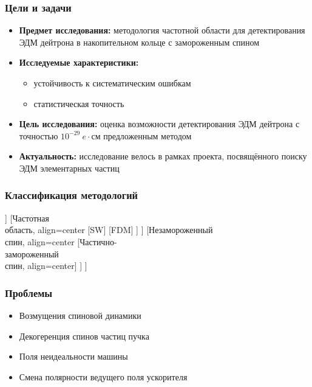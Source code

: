 \documentclass[14pt]{beamer}
\begin{document}
\begin{frame}
\frametitle{Цели и задачи}
\begin{itemize}
  \item \textbf{Предмет исследования:} методология частотной области для детектирования ЭДМ дейтрона в накопительном кольце с замороженным спином
  \item \textbf{Исследуемые характеристики:} 
  \begin{itemize}
  	\item устойчивость к систематическим ошибкам
  	\item статистическая точность
  \end{itemize}
  \item \textbf{Цель исследования:} оценка возможности детектирования ЭДМ дейтрона с точностью $10^{-29}~e\cdot$см предложенным методом
  \item \textbf{Актуальность:} исследование велось в рамках проекта, посвящённого поиску ЭДМ элементарных частиц
\end{itemize}
\end{frame}
\begin{frame}\frametitle{Классификация методологий}
\begin{forest}
	[SR EDM
	[Замороженный\\ спин, align=center
	[Пространственная\\ область, align=center
	[BNL FS]
	[D-MR]
	]
	[Частотная\\ область, align=center
	[SW]
	[FDM]
	]
	]
	[Незамороженный\\ спин, align=center
	[Частично-\\замороженный\\спин, align=center]
	]
	]
\end{forest}
\end{frame}
\begin{frame}
\frametitle{Проблемы}
\begin{itemize}
  \item Возмущения спиновой динамики
  \item Декогеренция спинов частиц пучка
  \item Поля неидеальности машины
  \item Смена полярности ведущего поля ускорителя
\end{itemize}
\end{frame}
\end{document}
